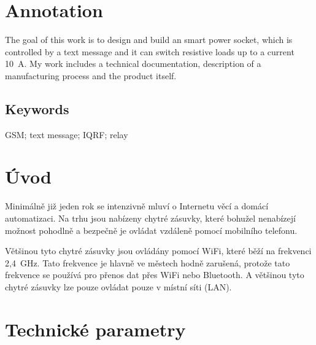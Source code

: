 \documentclass[12pt,a4paper,oneside]{article}
\begin{document}
\section*{Annotation}

The goal of this work is to design and build an smart power socket, which is controlled  by a  text message and it can switch resistive loads up to a current 10~A. My work includes a technical documentation, description of a manufacturing process and the product itself.

\subsection*{Keywords}

GSM; text message; IQRF; relay

\newpage

\tableofcontents

\newpage

\section*{Úvod}


Minimálně již jeden rok se intenzivně mluví o Internetu věcí a domácí automatizaci. Na trhu jsou nabízeny chytré zásuvky, které bohužel nenabízejí možnost pohodlně a bezpečně je ovládat vzdáleně pomocí mobilního telefonu.

Většinou tyto chytré zásuvky jsou ovládány pomocí WiFi, které běží na frekvenci 2,4~GHz. Tato frekvence je hlavně ve městech hodně zarušená, protože tato frekvence se používá pro přenos dat přes WiFi nebo Bluetooth\cite{ism-band}. A většinou tyto chytré zásuvky lze pouze ovládat pouze v místní síti (LAN).

\newpage

\section{Technické parametry}
\end{document}
